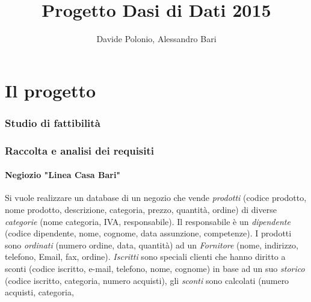 \documentclass[10pt,a4paper,openany,notitlepage]{article}
\author{Davide Polonio, Alessandro Bari}
\title{Progetto Dasi di Dati 2015}
\begin{document}
\maketitle
\newpage
\tableofcontents
\newpage

\section{Il progetto}
	\subsubsection{Studio di fattibilit\`a}
	\subsubsection{Raccolta e analisi dei requisiti}
		\paragraph{Negiozio "Linea Casa Bari"}
			Si vuole realizzare un database di un negozio che vende
                        \textit{prodotti} (codice prodotto, nome prodotto,
                        descrizione, categoria, prezzo, quantit\`a, ordine) di
                        diverse \textit{categorie} (nome categoria, IVA,
                        responsabile).  Il responsabile \`e un
                        \textit{dipendente} (codice dipendente, nome, cognome,
                        data assunzione, competenze). I prodotti sono
                        \textit{ordinati} (numero ordine, data, quantit\`a) ad
                        un \textit{Fornitore} (nome, indirizzo, telefono, Email,
                        fax, ordine). \textit{Iscritti} sono speciali clienti
                        che hanno diritto a sconti (codice iscritto, e-mail,
                        telefono, nome, cognome) in base ad un suo
                        \textit{storico} (codice iscritto, categoria, numero
                        acquisti), gli \textit{sconti} sono calcolati (numero
                        acquisti, categoria, %
\end{document}

